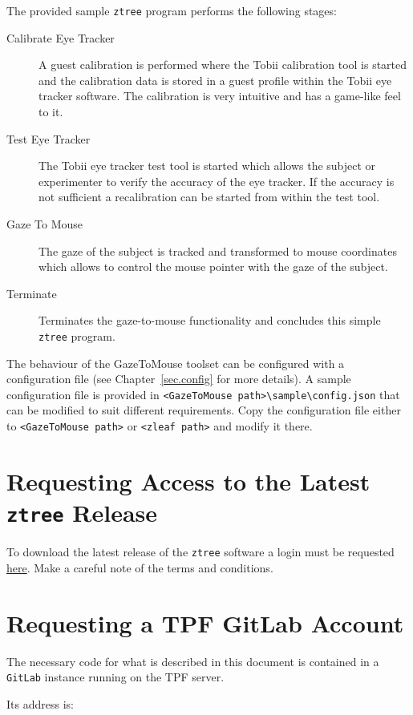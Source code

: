 \documentclass[a4paper,oneside]{book}
\begin{document}
The provided sample \texttt{ztree} program performs the following stages:
\begin{description}
    \item[Calibrate Eye Tracker]
        A guest calibration is performed where the Tobii calibration tool is started and the calibration data is stored in a guest profile within the Tobii eye tracker software.
        The calibration is very intuitive and has a game-like feel to it.
    \item[Test Eye Tracker]
        The Tobii eye tracker test tool is started which allows the subject or experimenter to verify the accuracy of the eye tracker.
        If the accuracy is not sufficient a recalibration can be started from within the test tool.
    \item[Gaze To Mouse]
        The gaze of the subject is tracked and transformed to mouse coordinates which allows to control the mouse pointer with the gaze of the subject.
    \item[Terminate]
        Terminates the gaze-to-mouse functionality and concludes this simple \texttt{ztree} program.
\end{description}

The behaviour of the GazeToMouse toolset can be configured with a configuration file (see Chapter~\ref{sec.config} for more details).
A sample configuration file is provided in \texttt{<GazeToMouse path>\textbackslash sample\textbackslash config.json} that can be modified to suit different requirements.
Copy the configuration file either to \texttt{<GazeToMouse path>} or \texttt{<zleaf path>} and modify it there.

\section{Requesting Access to the Latest \texttt{ztree} Release}
\label{sec.ztree}
To download the latest release of the \texttt{ztree} software a login must be requested \href{https://www.uzh.ch/ztree/ssl-dir/index.php?action=obtain}{here}.
Make a careful note of the terms and conditions.

\section{Requesting a TPF GitLab Account}
\label{sec.gitlab}
The necessary code for what is described in this document is contained in a \texttt{GitLab} instance running on the TPF server.

Its address is:
\end{document}
